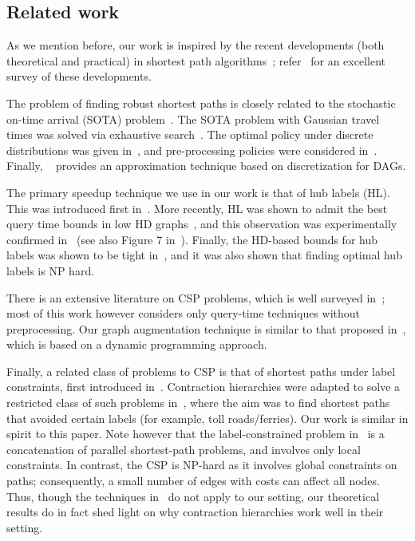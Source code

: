 \subsection{Related work}

As we mention before, our work is inspired by the recent developments (both theoretical and practical) in shortest path algorithms~\cite{highway2013,hubimplem,highway2010,dimacs09,geisberger_ch_definition,skeleton}; refer~\cite{goldberg_survey} for an excellent survey of these developments. 


The problem of finding robust shortest paths is closely related to the stochastic on-time arrival (SOTA) problem~\cite{fan2005arriving}.
The SOTA problem with Gaussian travel times was solved via exhaustive search~\cite{nikolova_gaussian}. The optimal policy under discrete distributions was given in~\cite{samaranayake2012speedup}, and pre-processing policies were considered in~\cite{sabran2014precomputation}. Finally, ~\cite{nikolova_discretization} provides an approximation technique based on discretization for DAGs.

The primary speedup technique we use in our work is that of hub labels (HL). This was introduced first in~\cite{cohen_definition_hl}. More recently, HL was shown to admit the best query time bounds in low HD graphs~\cite{highway2013,highway2010}, and this observation was experimentally confirmed in~\cite{hubimplem} (see also Figure 7 in~\cite{goldberg_survey}).  
Finally, the HD-based bounds for hub labels was shown to be tight in~\cite{babenko_hl_complexity,white_complexity_hd}, and it was also shown that finding optimal hub labels is NP hard.

There is an extensive literature on CSP problems, which is well surveyed in~\cite{csp_survey}; most of this work however considers only query-time techniques without preprocessing. Our graph augmentation technique is similar to that proposed in~\cite{alex_bicriteria}, which is based on a dynamic programming approach. 

Finally, a related class of problems to CSP is that of shortest paths under label constraints, first introduced in~\cite{language_csp}. Contraction hierarchies were adapted to solve a restricted class of such problems in~\cite{rice_csp}, where the aim was to find shortest paths that avoided certain labels (for example, toll roads/ferries). Our work is similar in spirit to this paper. Note however that the label-constrained problem in~\cite{rice_csp} is a concatenation of parallel shortest-path problems, and involves only local constraints. 
In contrast, the CSP is NP-hard as it involves global constraints on paths; consequently, a small number of edges with costs can affect all nodes. Thus, though the techniques in~\cite{rice_csp} do not apply to our setting, our theoretical results do in fact shed light on why contraction hierarchies work well in their setting.